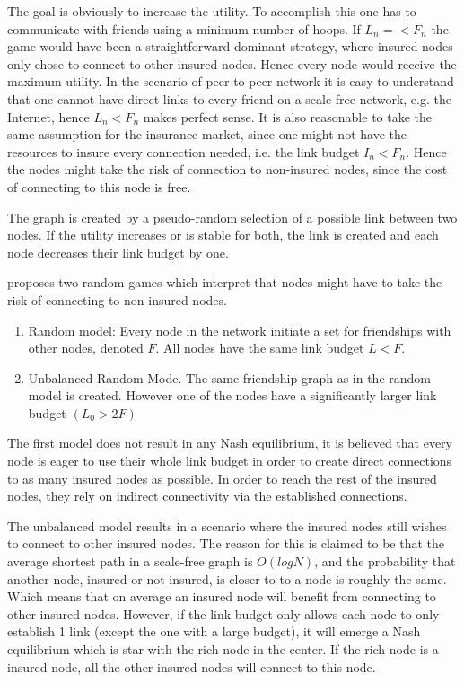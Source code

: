 The goal is obviously to increase the utility. To accomplish this one has to communicate with friends using a minimum number of hoops. If $L_{n}=<F_{n}$ the game would have been a straightforward dominant strategy, where insured nodes only chose to connect to other insured nodes. Hence every node would receive the maximum utility. In the scenario of peer-to-peer network it is easy to understand that one cannot have direct links to every friend on a scale free network, e.g. the Internet, hence $L_{n}<F_{n}$ makes perfect sense. It is also reasonable to take the same assumption  for the insurance market, since one might not have the resources to insure every connection needed, i.e. the link budget $I_{n} < F_{n}$. Hence the nodes might take the risk of connection to non-insured nodes, since the cost of connecting to this node is free.

The graph is created by a pseudo-random selection of a possible link between two nodes. If the utility increases or is stable for both, the link is created and each node decreases their link budget by one.

 
\cite{danezis2006network} proposes two random games which interpret that nodes might have to take the risk of connecting to non-insured nodes.
\begin{enumerate}
\item Random model: Every node in the network initiate a set for friendships with other nodes, denoted $F$. All nodes have the same link budget $L<F$. 
\item Unbalanced Random Mode. The same friendship graph as in the random model is created. However one of the nodes have a significantly larger link budget $(L_{0} > 2 F)$
\end{enumerate}

The first model does not result in any Nash equilibrium, it is believed that every node is eager to use their whole link budget in order to create direct connections to as many insured nodes as possible. In order to reach the rest of the insured nodes, they rely on indirect connectivity via the established connections.

The unbalanced model results in a scenario where the insured nodes still wishes to connect to other insured nodes. The reason for this is claimed to be that the average shortest path in a scale-free graph is $O(log N)$, and the probability that another node, insured or not insured, is closer to to a node is roughly the same. Which means that on average an insured node will benefit from connecting to other insured nodes. 
However, if the link budget only allows each node to only establish 1 link (except the one with a large budget), it will emerge a Nash equilibrium which is star with the rich node in the center. If the rich node is a insured node, all the other insured nodes will connect to this node. 







